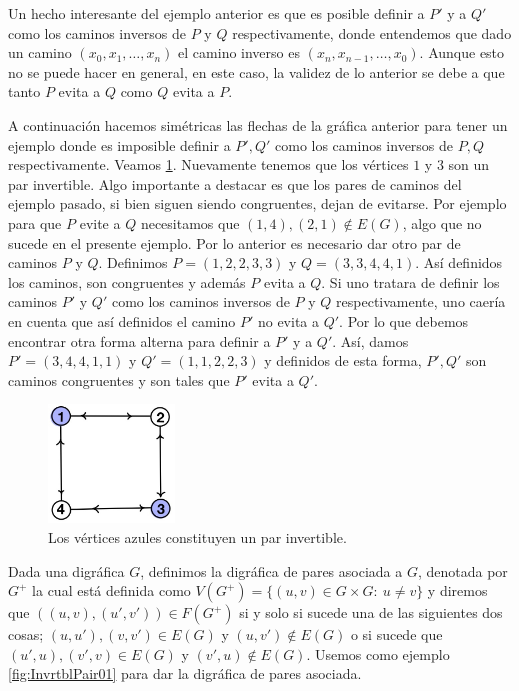 Un hecho interesante del ejemplo anterior es que es posible definir a $P'$ y a $Q'$ como los caminos inversos de $P$ y $Q$ respectivamente, donde entendemos que dado un camino $(x_0,x_1, \dots, x_n)$ el camino inverso es $(x_n,x_{n-1}, \dots, x_0)$. Aunque esto no se puede hacer en general, en este caso, la validez de lo anterior se debe a que tanto $P$ evita a $Q$ como $Q$ evita a $P$. 

A continuación hacemos simétricas las flechas de la gráfica anterior para tener un ejemplo donde es imposible definir a $P', Q'$ como los caminos inversos de $P, Q$ respectivamente. Veamos \cref{fig:InvrtblPair02}. Nuevamente tenemos que los vértices $1$ y $3$ son un par invertible. Algo importante a destacar es que los pares de caminos del ejemplo pasado, si bien siguen siendo congruentes, dejan de evitarse. Por ejemplo para que $P$ evite a $Q$ necesitamos que $(1,4),(2,1)\notin E(G)$, algo que no sucede en el presente ejemplo. Por lo anterior es necesario dar otro par de caminos $P$ y $Q$. Definimos $P=(1,2,2,3,3)$ y $Q=(3,3,4,4,1)$. Así definidos los caminos, son congruentes y además $P$ evita a $Q$. Si uno tratara de definir los caminos $P'$ y $Q'$ como los caminos inversos de $P$ y $Q$ respectivamente, uno caería en cuenta que así definidos el camino $P'$ no evita a $Q'$. Por lo que debemos encontrar otra forma alterna para definir a $P'$ y a $Q'$. Así, damos $P'=(3,4,4,1,1)$ y $Q'=(1,1,2,2,3)$ y definidos de esta forma, $P', Q'$ son caminos congruentes y son tales que $P'$ evita a $Q'$.

\begin{figure}[H]
  \centering
  \includegraphics[width=0.3\textwidth]{recursos/capturas/InvrtblPair02.jpg}
  \caption{Los vértices azules constituyen un par invertible.}
  \label{fig:InvrtblPair02}
\end{figure}

Dada una digráfica $G$, definimos la digráfica de pares asociada a $G$, denotada por $G^{+}$ la cual está definida como $V(G^{+})=\{ (u,v)\in G\times G \colon\ u\neq v \}$ y diremos que $((u,v),(u',v'))\in F(G^{+})$ si y solo si sucede una de las siguientes dos cosas; $(u,u'),(v,v')\in E(G)$ y $(u,v')\notin E(G)$ o si sucede que $(u',u),(v',v)\in E(G)$ y $(v',u)\notin E(G)$. Usemos como ejemplo \cref{fig:InvrtblPair01} para dar la digráfica de pares asociada.

